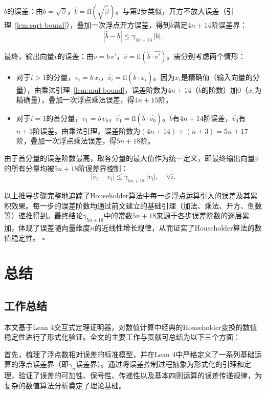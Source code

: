﻿\documentclass[UTF8,a4paper,openany]{ctexbook}
\theoremstyle{qrplain}
\renewenvironment{proof}[1][证明]
{\par\noindent{\qrthmchinese\bfseries #1. }\ignorespaces}
{\hfill$\square$\par}
\begin{document}
\begin{proof}
$b$的误差：由$b=\sqrt{\beta}$，$\hat{b}=\mathrm{fl}(\sqrt{\hat{\beta}})$。与第2步类似，开方不放大误差（引理~\ref{lem:sqrt-bound}），叠加一次浮点开方误差，得到$\hat{b}$满足$4n+14$阶误差界：
$$
|\hat{b} - b| \le \gamma_{4n+14}\,|b|.
$$

最终，输出向量$v$的误差：由$v=b\,v'$，$\hat{v}=\mathrm{fl}(\hat{b}\cdot\hat{v'})$。需分别考虑两个情形：

\begin{itemize}
  \item 对于$i>1$的分量，$v_i=b\,x_i$，$\hat{v_i}=\mathrm{fl}(\hat{b}\cdot x_i)$。因为$x_i$是精确值（输入向量的分量），由乘法引理~\ref{lem:mul-bound}，误差阶数为$4n+14$（$\hat{b}$的阶数）加$0$（$x_i$为精确量），叠加一次浮点乘法误差，得$4n+15$阶。
  \item 对于$i=1$的首分量，$v_1=b\,v_0$，$\hat{v_1}=\mathrm{fl}(\hat{b}\cdot\hat{v_0})$。$\hat{b}$有$4n+14$阶误差，$\hat{v_0}$有$n+3$阶误差。由乘法引理，误差阶数为$(4n+14)+(n+3)=5n+17$阶，叠加一次浮点乘法误差，得$5n+18$阶。
\end{itemize}

由于首分量的误差阶数最高，取各分量的最大值作为统一定义，即最终输出向量$\hat{v}$的所有分量均被$5n+18$阶误差界控制：
$$
\bigl|\hat{v}_i - v_i\bigr| \le \gamma_{5n+18}\,|v_i|,\quad \forall i.
$$

以上推导步骤完整地追踪了Householder算法中每一步浮点运算引入的误差及其累积效果。每一步的误差阶数均通过前文建立的基础引理（加法、乘法、开方、倒数等）递推得到。最终结论$\gamma_{5n+18}$中的常数$5n+18$来源于各步误差阶数的逐层累加，体现了误差随向量维度$n$的近线性增长规律，从而证实了Householder算法的数值稳定性。
\end{proof}

\chapter{总结}

\section{工作总结}

本文基于Lean 4交互式定理证明器，对数值计算中经典的Householder变换的数值稳定性进行了形式化验证。全文的主要工作与贡献可总结为以下三个方面：

首先，梳理了浮点数相对误差的标准模型，并在Lean 4中严格定义了一系列基础运算的浮点误差界（即$\gamma_n$误差界）。通过将误差控制过程抽象为形式化的引理和定理，验证了误差的可加性、保号性、传递性以及基本四则运算的误差传递规律，为复杂的数值算法分析奠定了理论基础。
\end{document}
